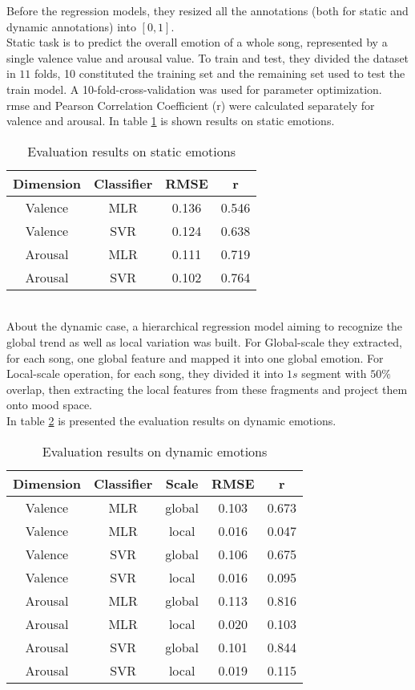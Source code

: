Before the regression models, they resized all the annotations (both for static and dynamic annotations) into $[0,1]$.
\\ \indent
Static task is to predict the overall emotion of a whole song, represented by a single valence value and arousal value. To train and test, they divided the dataset in $11$ folds, 10 constituted the training set and the remaining set used to test the train model. A 10-fold-cross-validation was used for parameter optimization.
\\
\gls{rmse} and Pearson Correlation Coefficient (r) were calculated separately for valence and arousal. In table \ref{table:PMEmo_results_static} is shown results on static emotions.
\begin{table}[h!]
	\centering
	\begin{tabular}{|c|c|c|c|}
		\hline
		Dimension & Classifier & RMSE & r \\ [0.5ex] 
		\hline\hline Valence & MLR & 0.136 & 0.546 \\ 
		\hline Valence & SVR & 0.124 & 0.638 \\
		\hline Arousal & MLR & 0.111 & 0.719 \\
		\hline Arousal & SVR & 0.102 & 0.764 \\
		\hline
	\end{tabular}
	\caption{Evaluation results on static emotions}
	\label{table:PMEmo_results_static}
\end{table}
\\
About the dynamic case, a hierarchical regression model aiming to recognize the global trend as well as local variation was built. For Global-scale they extracted, for each song, one global feature and mapped it into one global emotion. For Local-scale operation, for each song, they divided it into $1s$ segment with $50\%$ overlap, then extracting the local features from these fragments and project them onto mood space.
\\
In table \ref{table:PMEmo_results_dynamic} is presented the evaluation results on dynamic emotions.
\begin{table}[h!]
	\centering
	\begin{tabular}{|c|c|c|c|c|}
		\hline
		Dimension & Classifier & Scale & RMSE & r \\ [0.5ex] 
		\hline\hline Valence & MLR & global & 0.103 & 0.673 \\
		\hline Valence & MLR & local & 0.016 & 0.047 \\
		\hline Valence & SVR & global & 0.106 & 0.675 \\
		\hline Valence & SVR & local & 0.016 & 0.095 \\
		\hline Arousal & MLR & global & 0.113 & 0.816 \\
		\hline Arousal & MLR & local & 0.020 & 0.103 \\
		\hline Arousal & SVR & global & 0.101 & 0.844 \\
		\hline Arousal & SVR & local & 0.019 & 0.115 \\
		\hline
	\end{tabular}
	\caption{Evaluation results on dynamic emotions}
	\label{table:PMEmo_results_dynamic}
\end{table}
